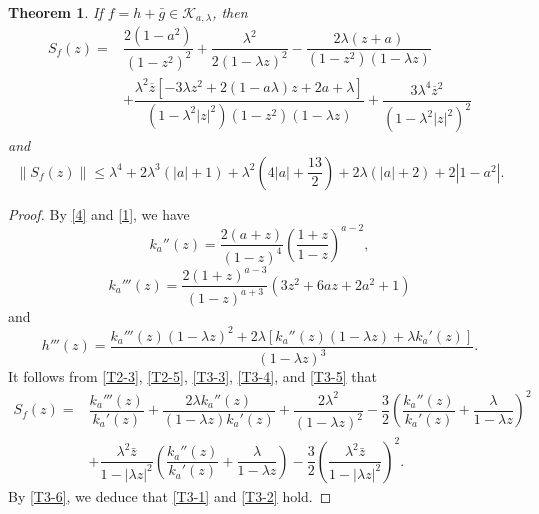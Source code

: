 \documentclass[11pt, reqno]{amsart}
\newtheorem{theorem}{Theorem}
\numberwithin{equation}{section}
\newcommand{\abs}[1]{\left\vert#1\right\vert}
\begin{document}
\begin{theorem}\label{T3}
	If $f=h+\bar{g}\in\mathcal{K}_{a,\lambda}$, then %
    \begin{equation}\label{T3-1}
        \begin{aligned}
S_f(z)=&\dfrac{2\left(1-a^2\right )}{{\left(1-z^2\right)}^2}+\dfrac{\lambda^2}{2\left(1-\lambda z\right)^2}-\dfrac{2\lambda(z+a)}{\left(1-z^2\right)(1-\lambda z)}\\
	&+\dfrac{\lambda^2\overline{z}[-3\lambda z^2+2(1-a\lambda )z+2a+\lambda]}{(1-\lambda^2|z|^2)(1-z^2)(1-\lambda z)}+\dfrac{3\lambda^4\overline{z}^2}{\left(1-\lambda^2|z|^2\right)^2}
        \end{aligned}
    \end{equation}
    and
    \begin{equation}\label{T3-2}
        \|S_f(z)\|\leq\lambda^4+2\lambda^3(\abs{a}+1)+\lambda^2\left(4\abs{a}+\dfrac{13}{2}\right)+2\lambda(\abs{a}+2)+2\abs{1-a^2}.
    \end{equation}
\end{theorem}
\begin{proof}
     By \eqref{4} and \eqref{1}, we have
        \begin{equation}\label{T3-3}
            k_a''(z)=\dfrac{2(a+z)}{(1-z)^4}\left(\dfrac{1+z}{1-z}\right)^{a-2},
        \end{equation}
        \begin{equation}\label{T3-4}
            k_a'''(z)=\dfrac{2\left(1+z\right)^{a-3}}{\left(1-z\right)^{a+3}}\left(3z^2+6az+2a^2+1\right)
        \end{equation}
        and
         \begin{equation}\label{T3-5}
            h'''(z)=\dfrac{k_a'''(z)(1-\lambda z)^2+2\lambda\left[k_a''(z)(1-\lambda z)+\lambda k_a'(z)\right]}{(1-\lambda z)^3}.
        \end{equation}
  It follows from \eqref{T2-3}, \eqref{T2-5}, \eqref{T3-3}, \eqref{T3-4}, and \eqref{T3-5} that
    \begin{equation}\label{T3-6}
        \begin{aligned}
           S_f(z)=&\dfrac{k_a'''(z)}{k_a'(z)}+\dfrac{2\lambda k_a''(z)}{(1-\lambda z)k_a'(z)}+\dfrac{2\lambda^2}{(1-\lambda z)^2}-\dfrac{3}{2}\left(\dfrac{k_a''(z)}{k_a'(z)}+\dfrac{\lambda }{1-\lambda z}\right)^2\\
    &+\dfrac{\lambda^2\bar{z} }{1-\abs{\lambda z}^2}\left(\dfrac{k_a''(z)}{k_a'(z)}+\dfrac{\lambda }{1-\lambda z}\right)-\dfrac{3}{2}\left(\dfrac{\lambda^2\bar{z} }{1-\abs{\lambda z}^2}\right)^2.
        \end{aligned}
    \end{equation}
By \eqref{T3-6}, we deduce that \eqref{T3-1} and \eqref{T3-2} hold. 
   \end{proof} 
\end{document}
